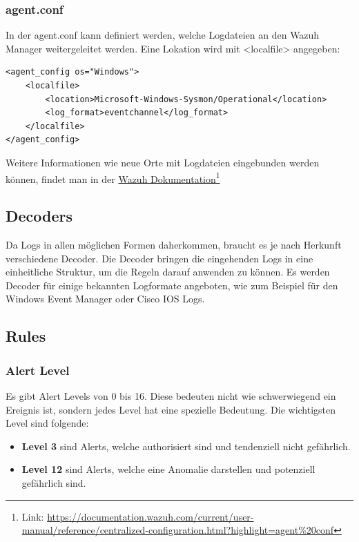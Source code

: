 \subsubsection{agent.conf}
In der agent.conf kann definiert werden, welche Logdateien an den Wazuh Manager weitergeleitet werden. 
Eine Lokation wird mit <localfile> angegeben:
\begin{lstlisting}
<agent_config os="Windows">
    <localfile>
        <location>Microsoft-Windows-Sysmon/Operational</location>
        <log_format>eventchannel</log_format>
    </localfile>
</agent_config>
\end{lstlisting}
Weitere Informationen wie neue Orte mit Logdateien eingebunden werden können, findet man in der \href{https://documentation.wazuh.com/current/user-manual/reference/centralized-configuration.html?highlight=agent%20conf}{Wazuh Dokumentation}\footnote{Link: \href{https://documentation.wazuh.com/current/user-manual/reference/centralized-configuration.html?highlight=agent\%20conf}{https://documentation.wazuh.com/current/user-manual/reference/centralized-configuration.html?highlight=agent\%20conf}}

\subsection{Decoders}
Da Logs in allen möglichen Formen daherkommen, braucht es je nach Herkunft verschiedene Decoder.
Die Decoder bringen die eingehenden Logs in eine einheitliche Struktur, um die Regeln darauf anwenden zu können.
Es werden Decoder für einige bekannten Logformate angeboten, wie zum Beispiel für den Windows Event Manager oder Cisco IOS Logs.

\subsection{Rules}

\subsubsection{Alert Level}
Es gibt Alert Levels von 0 bis 16. 
Diese bedeuten nicht wie schwerwiegend ein Ereignis ist, sondern jedes Level hat eine spezielle Bedeutung.
Die wichtigsten Level sind folgende:
\begin{itemize}
    \item \textbf{Level 3} sind Alerts, welche authorisiert sind und tendenziell nicht gefährlich.
    \item \textbf{Level 12} sind Alerts, welche eine Anomalie darstellen und potenziell gefährlich sind.
\end{itemize}

